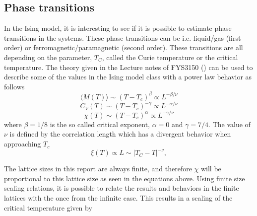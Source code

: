 \documentclass[12pt,english,a4paper]{article}
\begin{document}
\subsection{Phase transitions}
In the Ising model, it is interesting to see if it is possible to estimate phase transitions in the systems. These phase transitions can be i.e. liquid/gas (first order) or ferromagnetic/paramagnetic (second order). These transitions are all depending on the parameter, $T_C$, called the Curie temperature or the critical temperature. The theory given in the Lecture notes of FYS3150 (\cite{LectureIsing}) can be used to describe some of the values in the Ising model class with a power law behavior as follows
\begin{equation}
    \langle M(T)\rangle\sim (T-T_c)^\beta \propto L^{-\beta/\nu}
\end{equation}
\begin{equation}
    C_V(T)\sim (T-T_c)^{-\gamma} \propto L^{-\alpha/\nu}
\end{equation}
\begin{equation}
    \chi(T)\sim (T-T_c)^\alpha \propto L^{-\gamma/\nu}
\end{equation}
where $\beta = 1/8$ is the so called critical exponent, $\alpha = 0$ and $\gamma = 7/4$. The value of $\nu$ is defined by the correlation length which has a divergent behavior when approaching $T_c$
\begin{equation}
      \xi(T) \propto L \sim \left|T_C-T\right|^{-\nu},
  \label{eq:xi}
\end{equation}

\noindent The lattice sizes in this report are always finite, and therefore $\chi$ will be proportional to this lattice size as seen in the equations above. Using finite size scaling relations, it is possible to relate the results and behaviors in the finite lattices with the once from the infinite case. This results in a scaling of the critical temperature given by
\end{document}
